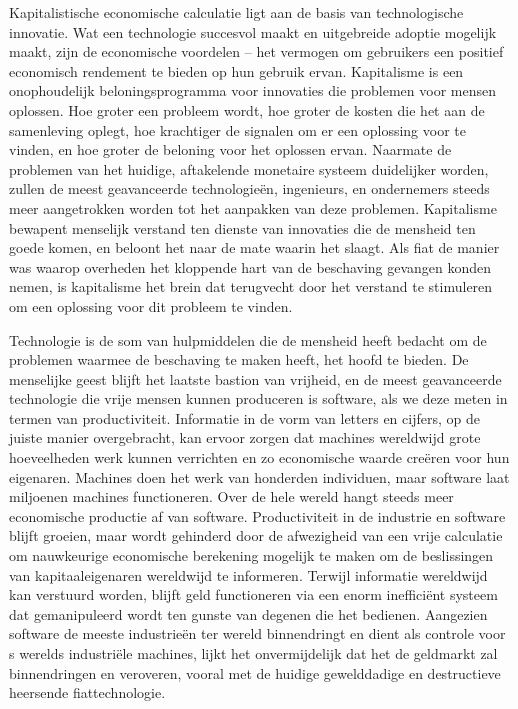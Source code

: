 \documentclass[
  a5paper,
  smalldemyvopaper,11pt,twoside,onecolumn,openright,extrafontsizes,
hidelinks]{memoir}
\begin{document}
Kapitalistische economische calculatie ligt aan de basis van
technologische innovatie. Wat een technologie succesvol maakt en
uitgebreide adoptie mogelijk maakt, zijn de economische voordelen -- het
vermogen om gebruikers een positief economisch rendement te bieden op
hun gebruik ervan. Kapitalisme is een onophoudelijk beloningsprogramma
voor innovaties die problemen voor mensen oplossen. Hoe groter een
probleem wordt, hoe groter de kosten die het aan de samenleving oplegt,
hoe krachtiger de signalen om er een oplossing voor te vinden, en hoe
groter de beloning voor het oplossen ervan. Naarmate de problemen van
het huidige, aftakelende monetaire systeem duidelijker worden, zullen de
meest geavanceerde technologieën, ingenieurs, en ondernemers steeds meer
aangetrokken worden tot het aanpakken van deze problemen. Kapitalisme
bewapent menselijk verstand ten dienste van innovaties die de mensheid
ten goede komen, en beloont het naar de mate waarin het slaagt. Als fiat
de manier was waarop overheden het kloppende hart van de beschaving
gevangen konden nemen, is kapitalisme het brein dat terugvecht door het
verstand te stimuleren om een oplossing voor dit probleem te vinden.

Technologie is de som van hulpmiddelen die de mensheid heeft bedacht om
de problemen waarmee de beschaving te maken heeft, het hoofd te bieden.
De menselijke geest blijft het laatste bastion van vrijheid, en de meest
geavanceerde technologie die vrije mensen kunnen produceren is software,
als we deze meten in termen van productiviteit. Informatie in de vorm
van letters en cijfers, op de juiste manier overgebracht, kan ervoor
zorgen dat machines wereldwijd grote hoeveelheden werk kunnen verrichten
en zo economische waarde creëren voor hun eigenaren. Machines doen het
werk van honderden individuen, maar software laat miljoenen machines
functioneren. Over de hele wereld hangt steeds meer economische
productie af van software. Productiviteit in de industrie en software
blijft groeien, maar wordt gehinderd door de afwezigheid van een vrije
calculatie om nauwkeurige economische berekening mogelijk te maken om de
beslissingen van kapitaaleigenaren wereldwijd te informeren. Terwijl
informatie wereldwijd kan verstuurd worden, blijft geld functioneren via
een enorm inefficiënt systeem dat gemanipuleerd wordt ten gunste van
degenen die het bedienen. Aangezien software de meeste industrieën ter
wereld binnendringt en dient als controle voor s werelds industriële
machines, lijkt het onvermijdelijk dat het de geldmarkt zal
binnendringen en veroveren, vooral met de huidige gewelddadige en
destructieve heersende fiattechnologie.
\end{document}
